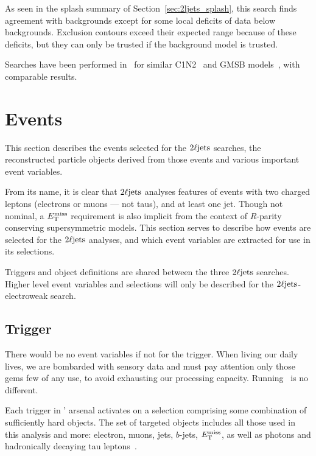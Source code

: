 As seen in the splash summary of Section~\ref{sec:2ljets_splash}, this search
finds agreement with backgrounds except for some local deficits of data below
backgrounds.
Exclusion contours exceed their expected range because of these deficits,
but they can only be trusted if the background model is trusted.

Searches have been performed in \cms\ for similar
C1N2~\cite{cms_susy_2022_c1n2} and GMSB models~\cite{
cms_susy_2018_partial_run2_combination,
cms_susy_2022_gmsb
}, with comparable results.



\section{Events}
\label{sec:2ljets_events}

This section describes the events selected for the $2\ell\mathrm{jets}$ searches, the
reconstructed particle objects derived from those events and various
important event variables.

From its name, it is clear that $2\ell\mathrm{jets}$ analyses features of events with
two charged leptons (electrons or muons --- not taus), and at least one jet.
Though not nominal, a $E_\mathrm{T}^\mathrm{miss}$ requirement is also implicit from the context
of $R$-parity conserving supersymmetric models.
This section serves to describe how events are selected for the $2\ell\mathrm{jets}$
analyses, and which event variables are extracted for use in its selections.

Triggers and object definitions are shared between the three $2\ell\mathrm{jets}$
searches.
Higher level event variables and selections will only be described for the
$2\ell\mathrm{jets}$-electroweak search.

\subsection{Trigger}
\label{sec:2ljets_trigger}
There would be no event variables if not for the trigger.
When living our daily lives, we are bombarded with sensory data and must pay
attention only those gems few of any use, to avoid exhausting our
processing capacity.
Running \atlas\ is no different.

Each trigger in \atlas' arsenal activates on a selection comprising some
combination of sufficiently hard objects.
The set of targeted objects includes all those used in this analysis and more:
electron, muons, jets, $b$-jets, $E_\mathrm{T}^\mathrm{miss}$, as well as photons and hadronically
decaying tau leptons~\cite{atlas_PERF_2007_01}.

